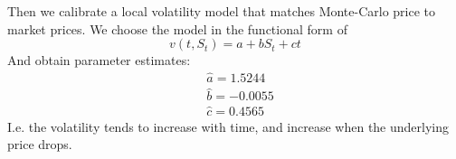 \documentclass[10 pt]{hwtemplate} %
\begin{document}
\begin{solution}
Then we calibrate a local volatility model that matches Monte-Carlo price to market prices. We choose the model in the functional form of
$$
v(t, S_t) = a + bS_t + ct
$$
And obtain parameter estimates: 
\begin{equation}
	\begin{split}
	&\hat{a} = 1.5244 \\
	&\hat{b} = -0.0055 \\
	&\hat{c} = 0.4565
\end{split}
\end{equation}
I.e. the volatility tends to increase with time, and increase when the underlying price drops.
\end{solution}
\end{document}
